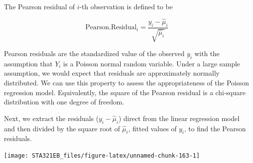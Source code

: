 \documentclass[
]{book}
\newenvironment{Shaded}{\begin{snugshade}}{\end{snugshade}}
\newcommand{\AttributeTok}[1]{\textcolor[rgb]{0.13,0.29,0.53}{#1}}
\newcommand{\DecValTok}[1]{\textcolor[rgb]{0.00,0.00,0.81}{#1}}
\newcommand{\DocumentationTok}[1]{\textcolor[rgb]{0.56,0.35,0.01}{\textbf{\textit{#1}}}}
\newcommand{\FunctionTok}[1]{\textcolor[rgb]{0.13,0.29,0.53}{\textbf{#1}}}
\newcommand{\NormalTok}[1]{#1}
\newcommand{\OtherTok}[1]{\textcolor[rgb]{0.56,0.35,0.01}{#1}}
\newcommand{\SpecialCharTok}[1]{\textcolor[rgb]{0.81,0.36,0.00}{\textbf{#1}}}
\newcommand{\StringTok}[1]{\textcolor[rgb]{0.31,0.60,0.02}{#1}}
\begin{document}
The Pearson residual of \(i\)-th observation is defined to be

\[
\text{Pearson.Residual}_i = \frac{y_i-\hat{\mu}_i}{\sqrt{\hat{\mu}_i}}
\]

Pearson residuals are the standardized value of the observed \(y_i\) with the assumption that \(Y_i\) is a Poisson normal random variable. Under a large sample assumption, we would expect that residuals are approximately normally distributed. We can use this property to assess the appropriateness of the Poisson regression model. Equivalently, the square of the Pearson residual is a chi-square distribution with one degree of freedom.

Next, we extract the residuals (\(y_i-\hat{\mu}_i\)) direct from the linear regression model and then divided by the square root of \(\hat{\mu}_i\), fitted values of \(y_i\), to find the Pearson residuals.

\begin{Shaded}
\end{Shaded}

\begin{center}\texttt{[image: STA321EB\_files/figure-latex/unnamed-chunk-163-1]} \end{center}
\end{document}

